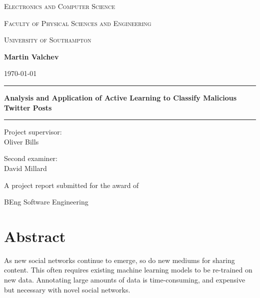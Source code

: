 \documentclass[a4paper,12pt]{article}
\begin{document}
	\begin{titlepage}
	
		\centering
	
		{\large \scshape Electronics and Computer Science \par}
		{\large \scshape Faculty of Physical Sciences and Engineering \par}
		{\large \scshape University of Southampton \par}
		\vspace{3cm}
		
		{\Large \textbf{Martin Valchev} \par} %
		\vspace{0.25cm}
		{\large \today \par}
		
		\vfill
		
		\hrule height 0.4pt
		\vspace{1cm}
			\huge
			\textbf{Analysis and Application of Active Learning to Classify Malicious Twitter Posts} %
		\vspace{1cm}
		\hrule height 1.2pt
		
		\vfill
		
		{\Large Project supervisor: \\ Oliver Bills \par} %
		\vspace{0.5cm}
		{\Large Second examiner: \\ David Millard \par} %
	
		\vfill
		
		{\Large A project report submitted for the award of \par} %
		{\LARGE BEng Software Engineering \par} %
		\vspace{4cm}
	
	\end{titlepage}

\section*{Abstract}
As new social networks continue to emerge, so do new mediums for sharing content. This often requires existing machine learning models to be re-trained on new data. Annotating large amounts of data is time-consuming, and expensive but necessary with novel social networks.
\end{document}
